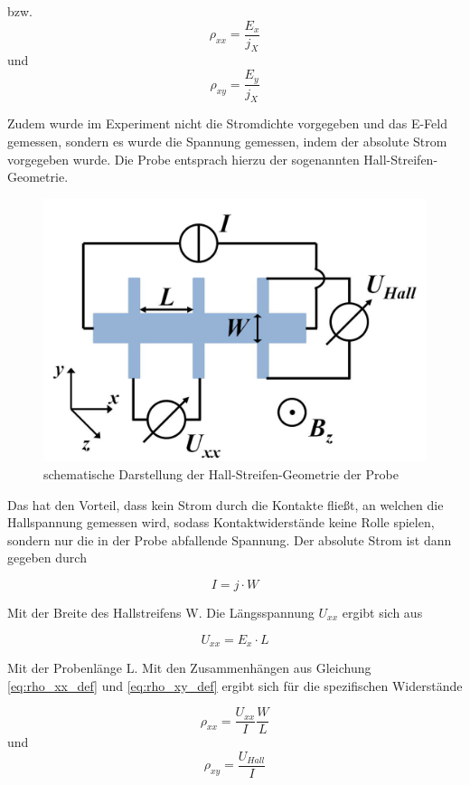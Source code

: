 bzw. 
\begin{equation}
\rho_{xx}=\frac{E_x}{j_X}
\label{eq:rho_xx_def}
\end{equation}
und 
\begin{equation}
\rho_{xy}=\frac{E_y}{j_X}
\label{eq:rho_xy_def}
\end{equation}

Zudem wurde im Experiment nicht die Stromdichte vorgegeben und das E-Feld gemessen, sondern es wurde die Spannung gemessen, indem der absolute Strom vorgegeben wurde. Die Probe entsprach hierzu der sogenannten Hall-Streifen-Geometrie. 

\begin{figure}
\centering
\includegraphics[width=0.4\linewidth]{images/Anleitungsheft/Hallstreifen_Geometrie_Anleitungsheft}
\caption[Hallstreifengeometrie]{schematische Darstellung der Hall-Streifen-Geometrie der Probe}
\label{fig:Hallstreifen_Geometrie_Anleitungsheft}
\end{figure}

Das hat den Vorteil, dass kein Strom durch die Kontakte fließt, an welchen die Hallspannung gemessen wird, sodass Kontaktwiderstände keine Rolle spielen, sondern nur die in der Probe abfallende Spannung. Der absolute Strom ist dann gegeben durch

\begin{equation}
I=j \cdot W
\label{eq:absoluter_Strom}
\end{equation}

Mit der Breite des Hallstreifens W. Die Längsspannung $U_{xx}$ ergibt sich aus

\begin{equation}
U_{xx}=E_x \cdot L
\label{eq:laengsspannung}
\end{equation}

Mit der Probenlänge L. Mit den Zusammenhängen aus Gleichung \ref{eq:rho_xx_def} und \ref{eq:rho_xy_def} ergibt sich für die spezifischen Widerstände

\begin{equation}
\rho_{xx}=\frac{U_{xx}}{I}\frac{W}{L}
\label{eq:rho_xx}
\end{equation}
und
\begin{equation}
\rho_{xy}=\frac{U_{Hall}}{I}
\label{eq:rho_xy}
\end{equation}

